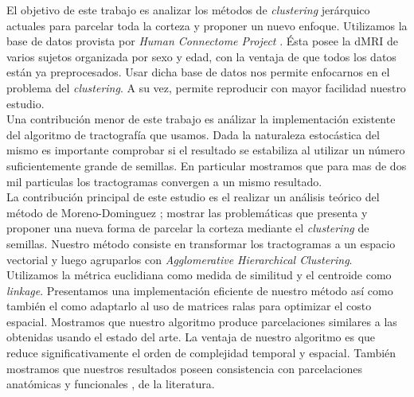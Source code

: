 El objetivo de este trabajo es analizar los m\'etodos de 
\textit{clustering} jer\'arquico actuales para parcelar toda la corteza y
proponer un nuevo enfoque. Utilizamos la base de datos provista por 
\textit{Human Connectome Project} \cite{VanEssen2012}. \'Esta posee la
dMRI de varios sujetos organizada por sexo y edad, con la ventaja de que
todos los datos est\'an ya preprocesados. Usar dicha base de datos nos
permite enfocarnos en el problema del \textit{clustering}. A su vez, 
permite reproducir con mayor facilidad nuestro estudio. \\

Una contribuci\'on menor de este trabajo es an\'alizar la implementaci\'on 
existente del algoritmo de tractograf\'ia que usamos. Dada la naturaleza
estoc\'astica del mismo es importante comprobar si el resultado se
estabiliza al utilizar un n\'umero suficientemente grande de semillas. En
particular mostramos que para mas de dos mil particulas los tractogramas
convergen a un mismo resultado. \\

La contribuci\'on principal de este estudio es el realizar un an\'alisis
te\'orico del m\'etodo de Moreno-Dominguez \cite{Moreno-Dominguez2014};
mostrar las problem\'aticas que presenta y proponer una nueva forma de
parcelar la corteza mediante el \textit{clustering} de semillas. Nuestro 
m\'etodo consiste en transformar los tractogramas a un espacio vectorial
y luego agruparlos con \textit{Agglomerative Hierarchical Clustering}. Utilizamos la m\'etrica euclidiana como medida de similitud y el centroide
como \textit{linkage}. Presentamos una implementaci\'on eficiente de
nuestro m\'etodo as\'i como tambi\'en el como adaptarlo al uso de matrices
ralas para optimizar el costo espacial. Mostramos que nuestro algoritmo
produce parcelaciones similares a las obtenidas usando el estado
del arte. La ventaja de nuestro algoritmo es que reduce significativamente
el orden de complejidad temporal y espacial. Tambi\'en mostramos que
nuestros resultados poseen consistencia con parcelaciones anat\'omicas
\cite{Desikan2006} y funcionales  \cite{Barch2013, Penfield1954}, de la
literatura.  \\

